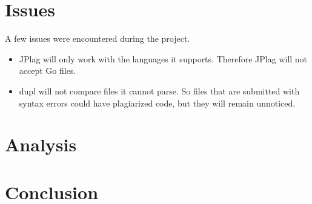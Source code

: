 \documentclass[12pt]{article}
\begin{document}
	\section{Issues}
		A few issues were encountered during the project.
		\begin{itemize}
			\item JPlag will only work with the languages it supports. Therefore JPlag will not accept Go files. 
			\item dupl will not compare files it cannot parse. So files that are submitted with syntax errors could have plagiarized code, but they will remain unnoticed.
		\end{itemize}
	\section{Analysis}
	\section{Conclusion}
	
	
\end{document}
